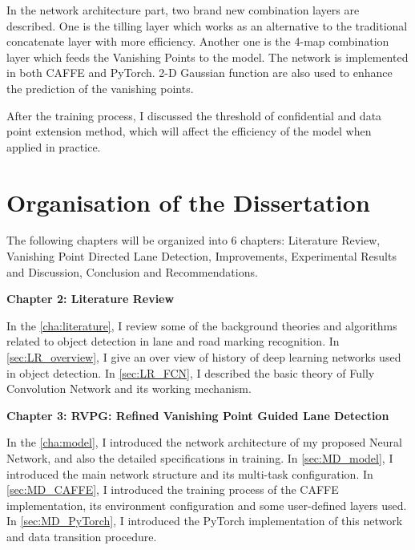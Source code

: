 \begin{spacing}{1.5}
In the network architecture part, two brand new combination layers are described. One is the tilling layer which works as an alternative to the traditional concatenate layer with more efficiency. Another one is the 4-map combination layer which feeds the Vanishing Points to the model. The network is implemented in both CAFFE and PyTorch. 2-D Gaussian function are also used to enhance the prediction of the vanishing points.

After the training process, I discussed the threshold of confidential and data point extension method, which will affect the efficiency of the model when applied in practice.

\section{Organisation of the Dissertation}
\label{sec:IN_organisation}

The following chapters will be organized into 6 chapters: Literature Review, Vanishing Point Directed Lane Detection, Improvements, Experimental Results and Discussion, Conclusion and Recommendations.

{\large\textbf{Chapter 2: Literature Review}}

In the \autoref{cha:literature}, I review some of the background theories and algorithms related to object detection in lane and road marking recognition. In \autoref{sec:LR_overview}, I give an over view of history of deep learning networks used in object detection. In \autoref{sec:LR_FCN}, I described the basic theory of Fully Convolution Network and its working mechanism. 

{\large\textbf{Chapter 3: RVPG: Refined Vanishing Point Guided Lane Detection}}

In the \autoref{cha:model}, I introduced the network architecture of my proposed Neural Network, and also the detailed specifications in training. In \autoref{sec:MD_model}, I introduced the main network structure and its multi-task configuration. In \autoref{sec:MD_CAFFE}, I introduced the training process of the CAFFE implementation, its environment configuration and some user-defined layers used. In \autoref{sec:MD_PyTorch}, I introduced the PyTorch implementation of this network and data transition procedure.


\end{spacing}

